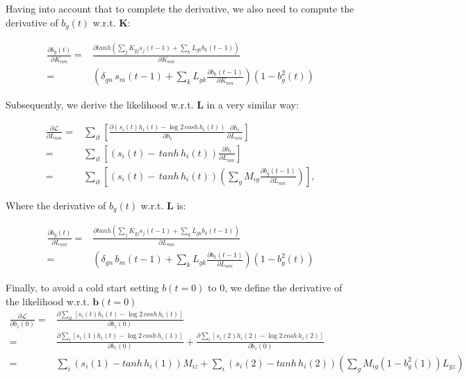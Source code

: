 \documentclass{article}
\def\*#1{\mathbf{#1}}
\begin{document}
Having into account that to complete the derivative, we also need to compute the derivative of $b_g(t)$ w.r.t. $\*K$:

\begin{align}
    \frac{\partial b_g(t)}{\partial K_{nm}} 
    =&  \frac{ \partial tanh {\left ( \sum_j K_{gj} s_j(t-1) + \sum_k L_{gk} b_k(t-1) \right )}}{\partial K_{nm}}
    \\ =& \left ( \delta_{gn} \, s_m(t-1) + \sum_k L_{gk} \frac{ \partial b_k(t-1)}{\partial K_{nm}} \right )
    \left ( 1 - b_g^2(t) \right )
\end{align}

Subsequently, we derive the likelihood w.r.t. $\*L$ in a very similar way:

\begin{align}
    \frac{\partial\mathcal{L}}{\partial L_{nm}} =& 
    \sum_{it} \left [ \frac{ \partial \left ( s_{i}(t) h_{i}(t) - \log{ 2 \, cosh \, h_{i}(t)} \right )}{\partial h_i} \frac{\partial h_i}{\partial L_{nm}} \right ]
    \\ =& \sum_{it} \left [ \left ( s_{i}(t) -  \, tanh \, h_{i}(t) \right ) \frac{\partial h_i}{\partial L_{nm}} \right ]
    \\ =& \sum_{it} \left [ \left ( s_{i}(t) -  \, tanh \, h_{i}(t) \right ) \left ( \sum_g M_{ig} \frac{\partial  b_g(t-1)}{\partial L_{nm}} \right )  \right ],
\end{align}

Where the derivative of $b_g(t)$ w.r.t. $\*L$ is:

\begin{align}
    \frac{\partial b_g(t)}{\partial L_{nm}} 
    =&  \frac{ \partial tanh {\left ( \sum_j K_{gj} s_j(t-1) + \sum_k L_{gk} b_k(t-1) \right )}}{\partial L_{nm}}
    \\ =& \left ( \delta_{gn} \, b_m(t-1) + \sum_k  L_{gk} \frac{ \partial b_k(t-1)}{\partial L_{nm}}\right ) \left ( 1 - b_g^2(t) \right )
\end{align}

Finally, to avoid a cold start setting $b(t=0)$ to 0, we define the derivative of the likelihood w.r.t. $\*b(t=0)$
\begin{align}
    \frac{\partial\mathcal{L}}{\partial b_{z}(0)} =& \frac{\partial \sum_{it} \left [ s_{i}(t) h_{i}(t) - \log{ 2 \, cosh \, h_{i}(t)} \right ]}{\partial b_{z}(0)}
    \\ = & \frac{\partial \sum_{i} \left [ s_{i}(1) h_{i}(t) - \log{ 2 \, cosh \, h_{i}(1)} \right ]}{\partial b_{z}(0)}
    + \frac{\partial \sum_{i} \left [ s_{i}(2) h_{i}(2) - \log{ 2 \, cosh \, h_{i}(2)} \right ]}{\partial b_{z}(0)}
     \\ =& \sum_{i}  \left ( s_{i}(1) - tanh \, h_{i}(1) \right )  M_{iz}
     + \sum_{i}  \left ( s_{i}(2) - tanh \, h_{i}(2) \right )  
     \left ( \sum_g M_{ig} (1 - b_g^2(1)) L_{gz
     } \right )
\end{align}
\end{document}

